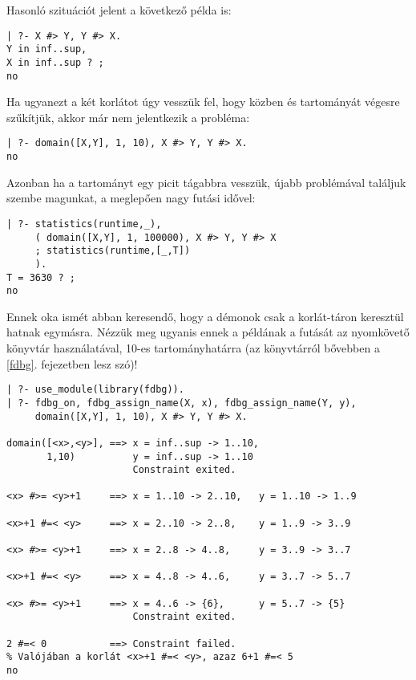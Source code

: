 Hasonló szituációt jelent a következő példa is:

\begin{verbatim}
| ?- X #> Y, Y #> X.
Y in inf..sup,
X in inf..sup ? ;
no
\end{verbatim}

Ha ugyanezt a két korlátot úgy vesszük fel, hogy közben  és  tartományát
végesre szűkítjük, akkor már nem jelentkezik a probléma:

\begin{verbatim}
| ?- domain([X,Y], 1, 10), X #> Y, Y #> X.
no
\end{verbatim}

Azonban ha a tartományt egy picit tágabbra vesszük, újabb problémával találjuk
szembe magunkat, a meglepően nagy futási idővel:

\begin{verbatim}
| ?- statistics(runtime,_),
     ( domain([X,Y], 1, 100000), X #> Y, Y #> X
     ; statistics(runtime,[_,T])
     ).
T = 3630 ? ;
no
\end{verbatim}

Ennek oka ismét abban keresendő, hogy a démonok csak a korlát-táron keresztül
hatnak egymásra. Nézzük meg ugyanis ennek a példának a futását az \fdbg
nyomkövető könyvtár használatával, 10-es tartományhatárra (az \fdbg könyvtárról
bővebben a \ref{fdbg}. fejezetben lesz szó)!

\begin{verbatim}
| ?- use_module(library(fdbg)).
| ?- fdbg_on, fdbg_assign_name(X, x), fdbg_assign_name(Y, y),
     domain([X,Y], 1, 10), X #> Y, Y #> X.

domain([<x>,<y>], ==> x = inf..sup -> 1..10,
       1,10)          y = inf..sup -> 1..10
                      Constraint exited.

<x> #>= <y>+1     ==> x = 1..10 -> 2..10,   y = 1..10 -> 1..9

<x>+1 #=< <y>     ==> x = 2..10 -> 2..8,    y = 1..9 -> 3..9

<x> #>= <y>+1     ==> x = 2..8 -> 4..8,     y = 3..9 -> 3..7

<x>+1 #=< <y>     ==> x = 4..8 -> 4..6,     y = 3..7 -> 5..7

<x> #>= <y>+1     ==> x = 4..6 -> {6},      y = 5..7 -> {5}
                      Constraint exited.

2 #=< 0           ==> Constraint failed.
% Valójában a korlát <x>+1 #=< <y>, azaz 6+1 #=< 5
no
\end{verbatim}

